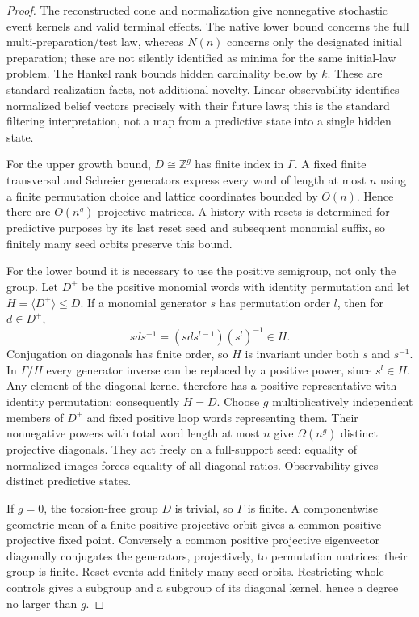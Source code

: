 \documentclass[11pt]{article}
\theoremstyle{remark}
\newcommand{\ZZ}{\mathbb Z}
\begin{document}
\begin{proof}
The reconstructed cone and normalization give nonnegative stochastic event kernels and valid terminal effects. The native lower bound concerns the full multi-preparation/test law, whereas $N(n)$ concerns only the designated initial preparation; these are not silently identified as minima for the same initial-law problem. The Hankel rank bounds hidden cardinality below by $k$. These are standard realization facts, not additional novelty. Linear observability identifies normalized belief vectors precisely with their future laws; this is the standard filtering interpretation, not a map from a predictive state into a single hidden state.

For the upper growth bound, $D\cong\ZZ^g$ has finite index in $\Gamma$. A fixed finite transversal and Schreier generators express every word of length at most $n$ using a finite permutation choice and lattice coordinates bounded by $O(n)$. Hence there are $O(n^g)$ projective matrices. A history with resets is determined for predictive purposes by its last reset seed and subsequent monomial suffix, so finitely many seed orbits preserve this bound.

For the lower bound it is necessary to use the positive semigroup, not only the group. Let $D^+$ be the positive monomial words with identity permutation and let $H=\langle D^+\rangle\leq D$. If a monomial generator $s$ has permutation order $l$, then for $d\in D^+$,
\[
 sds^{-1}=(sds^{l-1})(s^l)^{-1}\in H.
\]
Conjugation on diagonals has finite order, so $H$ is invariant under both $s$ and $s^{-1}$. In $\Gamma/H$ every generator inverse can be replaced by a positive power, since $s^l\in H$. Any element of the diagonal kernel therefore has a positive representative with identity permutation; consequently $H=D$. Choose $g$ multiplicatively independent members of $D^+$ and fixed positive loop words representing them. Their nonnegative powers with total word length at most $n$ give $\Omega(n^g)$ distinct projective diagonals. They act freely on a full-support seed: equality of normalized images forces equality of all diagonal ratios. Observability gives distinct predictive states.

If $g=0$, the torsion-free group $D$ is trivial, so $\Gamma$ is finite. A componentwise geometric mean of a finite positive projective orbit gives a common positive projective fixed point. Conversely a common positive projective eigenvector diagonally conjugates the generators, projectively, to permutation matrices; their group is finite. Reset events add finitely many seed orbits. Restricting whole controls gives a subgroup and a subgroup of its diagonal kernel, hence a degree no larger than $g$.
\end{proof}
\end{document}
